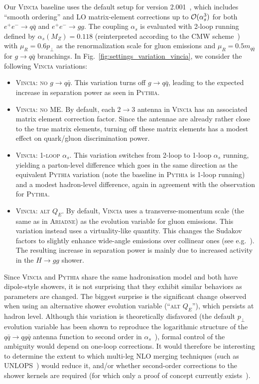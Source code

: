 \documentclass[11pt,letterpaper]{article}
\DeclareRobustCommand{\Fig}[1]{Fig.~\ref{#1}}
\begin{document}
Our \textsc{Vincia} baseline uses the default setup for version
2.001~\cite{Fischer:2016vfv}, which includes ``smooth ordering'' and LO matrix-element corrections \cite{Giele:2011cb} up
to ${\cal O}(\alpha_s^3)$ for both $e^+ e^- \to q \bar{q}$ and $e^+ e^- \to gg$.
%
The coupling $\alpha_s$ is evaluated with 2-loop running defined by $\alpha_s(M_Z)=0.118$
(reinterpreted according to the CMW scheme~\cite{Catani:1990rr}) with 
$\mu_R = 0.6 p_\perp$ as the renormalization scale for gluon emissions
and $\mu_R = 0.5 m_{q\bar{q}}$ for $g\to q\bar{q}$ branchings.
%
In \Fig{fig:settings_variation_vincia}, we consider the following \textsc{Vincia} variations: 
\begin{itemize}
\item \textsc{Vincia:  no $g \to q\bar{q}$}.  This variation turns off $g \to q \bar{q}$, leading to the expected increase in separation power as seen in \textsc{Pythia}.
\item \textsc{Vincia: no ME}.  By default, each $2 \to 3$ antenna in \textsc{Vincia} has an associated matrix element correction factor.  Since the antennae are already rather close to the true matrix elements, turning off these matrix elements has a modest effect on quark/gluon discrimination power.
\item \textsc{Vincia: 1-loop $\alpha_s$}.  This variation switches
  from 2-loop to 1-loop $\alpha_s$ running, yielding a
  parton-level difference which goes in the same direction as the
  equivalent \textsc{Pythia} variation (note the baseline in
  \textsc{Pythia} is 1-loop running) and a modest hadron-level
  difference, again in agreement with the observation for \textsc{Pythia}. 
\item \textsc{Vincia: alt $Q_E$}.  By default, \textsc{Vincia} uses a
  transverse-momentum scale (the same as in \textsc{Ariadne}) as the
  evolution variable for gluon emissions. This variation
  instead uses a virtuality-like quantity. This changes the Sudakov
  factors to slightly enhance wide-angle emissions over collinear
  ones (see e.g.~\cite{Fischer:2014bja}).  The resulting increase in separation
  power is mainly due to increased activity in the $H\to gg$ shower. 
\end{itemize}
Since \textsc{Vincia} and \textsc{Pythia} share the same hadronisation
model and both have dipole-style showers, it is not surprising that
they exhibit similar behaviors as parameters are changed.
%
The biggest surprise is the significant change observed when using an alternative shower
evolution variable (``\textsc{alt $Q_E$}''), which persists at hadron
level.
%
Although this variation is theoretically disfavored (the
default $p_\perp$ evolution variable has been shown to reproduce the logarithmic structure of the
  $q\bar{q}\to qg\bar{q}$ antenna function to second order in
  $\alpha_s$~\cite{Hartgring:2013jma}), formal control of the
  ambiguity would depend on one-loop corrections.  It would therefore be
  interesting to determine the extent to which multi-leg NLO
  merging techniques (such as UNLOPS~\cite{Lonnblad:2012ix}) would
  reduce it, and/or whether second-order corrections to the shower
  kernels are required (for which only a proof of concept currently
  exists~\cite{Li:2016yez}). 
\end{document}
